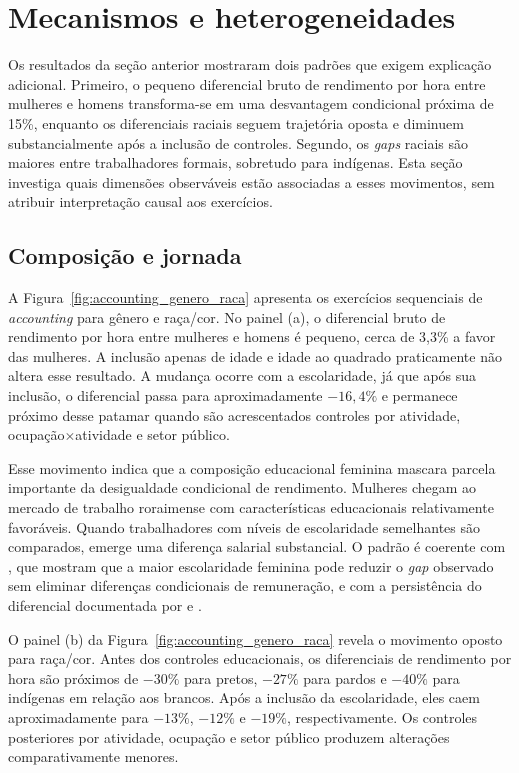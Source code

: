 \documentclass[12pt]{article}
\begin{document}
\section{Mecanismos e heterogeneidades}
\label{sec:mecanismos}

Os resultados da seção anterior mostraram dois padrões que exigem explicação
adicional. Primeiro, o pequeno diferencial bruto de rendimento por hora entre
mulheres e homens transforma-se em uma desvantagem condicional próxima de
15\%, enquanto os diferenciais raciais seguem trajetória oposta e diminuem
substancialmente após a inclusão de controles. Segundo, os \textit{gaps} raciais são
maiores entre trabalhadores formais, sobretudo para indígenas. Esta seção
investiga quais dimensões observáveis estão associadas a esses movimentos,
sem atribuir interpretação causal aos exercícios.

\subsection{Composição e jornada}
\label{subsec:composicao_jornada}

A Figura~\ref{fig:accounting_genero_raca} apresenta os exercícios sequenciais de
\textit{accounting} para gênero e raça/cor. No painel (a), o diferencial bruto
de rendimento por hora entre mulheres e homens é pequeno, cerca de 3,3\% a
favor das mulheres. A inclusão apenas de idade e idade ao quadrado praticamente
não altera esse resultado. A mudança ocorre com a escolaridade, já que após sua
inclusão, o diferencial passa para aproximadamente $-16,4\%$ e permanece
próximo desse patamar quando são acrescentados controles por atividade,
ocupação$\times$atividade e setor público.

Esse movimento indica que a composição educacional feminina mascara parcela
importante da desigualdade condicional de rendimento. Mulheres chegam ao
mercado de trabalho roraimense com características educacionais relativamente
favoráveis. Quando trabalhadores com níveis de escolaridade semelhantes são
comparados, emerge uma diferença salarial substancial. O padrão é coerente com
\citet{giuberti2005}, que mostram que a maior escolaridade feminina
pode reduzir o \textit{gap} observado sem eliminar diferenças condicionais de
remuneração, e com a persistência do diferencial documentada por
\citet{madalozzo2010} e \citet{morello2021}.

O painel (b) da Figura~\ref{fig:accounting_genero_raca} revela o movimento
oposto para raça/cor. Antes dos controles educacionais, os diferenciais de
rendimento por hora são próximos de $-30\%$ para pretos, $-27\%$ para pardos e
$-40\%$ para indígenas em relação aos brancos. Após a inclusão da escolaridade,
eles caem aproximadamente para $-13\%$, $-12\%$ e $-19\%$,
respectivamente. Os controles posteriores por atividade, ocupação e setor
público produzem alterações comparativamente menores.
\end{document}
